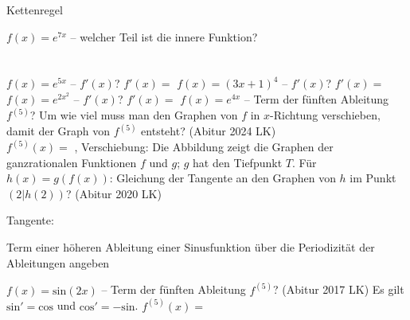 \setcounter{aufgabe}{13}

\begin{aufgabe}{Kettenregel}
\begin{teile}
\teil $f(x) = e^{7x}$ – welcher Teil ist die innere Funktion? \\  \\  \\ 
\teil $f(x) = e^{5x}$ – $f'(x)$? $f'(x) =$ \leerfeld
\teil $f(x) = (3x + 1)^4$ – $f'(x)$? $f'(x) =$ \leerfeld
\teil $f(x) = e^{2x^2}$ – $f'(x)$? $f'(x) =$ \leerfeld
\teil $f(x) = e^{4x}$ – Term der fünften Ableitung $f^{(5)}$? Um wie viel muss man den Graphen von $f$ in $x$-Richtung verschieben, damit der Graph von $f^{(5)}$ entsteht? \hfill (Abitur 2024 LK) \\ $f^{(5)}(x) =$ \leerfeld , Verschiebung: \leerfeld
\teil Die Abbildung zeigt die Graphen der ganzrationalen Funktionen $f$ und $g$; $g$ hat den Tiefpunkt $T$. Für $h(x) = g(f(x))$: Gleichung der Tangente an den Graphen von $h$ im Punkt $(2|h(2))$? \hfill (Abitur 2020 LK) \\

\begin{ksys}[xmin=-3,xmax=4,ymin=-3,ymax=5,ablesen]    \end{ksys}
Tangente: \leerfeld
\end{teile}
\end{aufgabe}

\begin{aufgabe}{Term einer höheren Ableitung einer Sinusfunktion über die Periodizität der Ableitungen angeben}
\begin{teile}
\teil $f(x) = \mathrm{sin}(2x)$ – Term der fünften Ableitung $f^{(5)}$? \hfill (Abitur 2017 LK) Es gilt $\mathrm{sin}' = \mathrm{cos}$ und $\mathrm{cos}' = -\mathrm{sin}$. $f^{(5)}(x) =$ \leerfeld
\end{teile}
\end{aufgabe}

